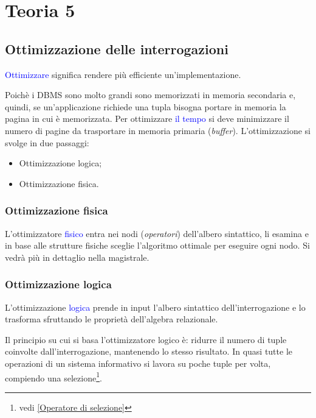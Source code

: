 \chapter{Teoria 5}

\section{Ottimizzazione delle interrogazioni}

\textcolor{blue}{Ottimizzare} significa rendere più efficiente un'implementazione. 

Poichè i DBMS sono molto grandi sono memorizzati in memoria secondaria e, quindi, se un'applicazione richiede una tupla bisogna portare in memoria la pagina in cui è memorizzata. Per ottimizzare \textcolor{blue}{il tempo} si deve minimizzare il numero di pagine da trasportare in memoria primaria (\textit{buffer}). 
L'ottimizzazione si svolge in due passaggi:
\begin{itemize}
    \item Ottimizzazione logica;
    \item Ottimizzazione fisica.
\end{itemize}

\subsection{Ottimizzazione fisica}

L’ottimizzatore \textcolor{blue}{fisico} entra nei nodi (\textit{operatori}) dell’albero sintattico, li esamina e in base alle strutture fisiche sceglie
l’algoritmo ottimale per eseguire ogni nodo. Si vedrà più in dettaglio nella magistrale.

\subsection{Ottimizzazione logica}

L'ottimizzazione \textcolor{blue}{logica} prende in input l’albero sintattico dell’interrogazione e lo trasforma sfruttando le proprietà dell’algebra relazionale.

Il principio su cui si basa l'ottimizzatore logico è: ridurre il numero di tuple coinvolte dall'interrogazione, mantenendo lo stesso risultato. In quasi tutte le operazioni di un sistema informativo si lavora su poche tuple per volta, compiendo una selezione\footnote{vedi \ref{Operatore di selezione}}.


